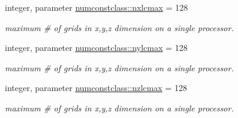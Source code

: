 \textbf{ }\par
\begin{DoxyCompactItemize}
\item 
integer, parameter \mbox{\hyperlink{namespacenumconstclass_a8219d90b9dea3ecb8b630e32e3c86026}{numconstclass\+::nxlcmax}} = 128
\begin{DoxyCompactList}\small\item\em maximum \# of grids in x,y,z dimension on a single processor. \end{DoxyCompactList}\item 
integer, parameter \mbox{\hyperlink{namespacenumconstclass_ab087d448ac5f3b93904c966d5790fdf2}{numconstclass\+::nylcmax}} = 128
\begin{DoxyCompactList}\small\item\em maximum \# of grids in x,y,z dimension on a single processor. \end{DoxyCompactList}\item 
integer, parameter \mbox{\hyperlink{namespacenumconstclass_a11dbfc82160f0abca94e67bc7811d3ea}{numconstclass\+::nzlcmax}} = 128
\begin{DoxyCompactList}\small\item\em maximum \# of grids in x,y,z dimension on a single processor. \end{DoxyCompactList}\end{DoxyCompactItemize}


